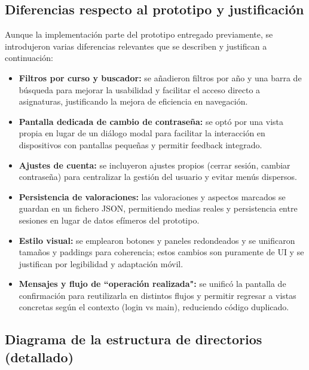 \documentclass[12pt,oneside]{book}
\begin{document}
\newpage
\subsection{Diferencias respecto al prototipo y justificaci\'on}

Aunque la implementaci\'on parte del prototipo entregado previamente, se introdujeron varias diferencias relevantes que se describen y justifican a continuaci\'on:

\begin{itemize}
    \item \textbf{Filtros por curso y buscador:} se a\~nadieron filtros por a\~no y una barra de b\'usqueda para mejorar la usabilidad y facilitar el acceso directo a asignaturas, justificando la mejora de eficiencia en navegaci\'on.
    \item \textbf{Pantalla dedicada de cambio de contrase\~na:} se opt\'o por una vista propia en lugar de un di\'alogo modal para facilitar la interacci\'on en dispositivos con pantallas peque\~nas y permitir feedback integrado.
    \item \textbf{Ajustes de cuenta:} se incluyeron ajustes propios (cerrar sesi\'on, cambiar contrase\~na) para centralizar la gesti\'on del usuario y evitar men\'us dispersos.
    \item \textbf{Persistencia de valoraciones:} las valoraciones y aspectos marcados se guardan en un fichero JSON, permitiendo medias reales y persistencia entre sesiones en lugar de datos ef\'imeros del prototipo.
    \item \textbf{Estilo visual:} se emplearon botones y paneles redondeados y se unificaron tamaños y paddings para coherencia; estos cambios son puramente de UI y se justifican por legibilidad y adaptaci\'on m\'ovil.
    \item \textbf{Mensajes y flujo de ``operaci\'on realizada":} se unific\'o la pantalla de confirmaci\'on para reutilizarla en distintos flujos y permitir regresar a vistas concretas seg\'un el contexto (login vs main), reduciendo c\'odigo duplicado.
\end{itemize}


\newpage

\subsection{Diagrama de la estructura de directorios (detallado)}
\end{document}
